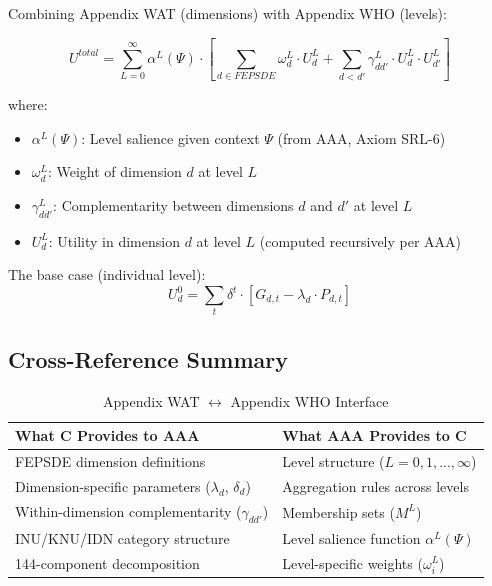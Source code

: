 \begin{tcolorbox}[colback=blue!5!white, colframe=blue!75!black, 
    title=The Complete EBF Utility Structure]

Combining Appendix WAT (dimensions) with Appendix WHO (levels):

\begin{equation}
\boxed{
U^{total} = \sum_{L=0}^{\infty} \alpha^L(\Psi) \cdot \left[ \sum_{d \in FEPSDE} \omega^L_d \cdot U^L_d + \sum_{d < d'} \gamma^L_{dd'} \cdot U^L_d \cdot U^L_{d'} \right]
}
\end{equation}

where:
\begin{itemize}[nosep]
\item $\alpha^L(\Psi)$: Level salience given context $\Psi$ (from AAA, Axiom SRL-6)
\item $\omega^L_d$: Weight of dimension $d$ at level $L$
\item $\gamma^L_{dd'}$: Complementarity between dimensions $d$ and $d'$ at level $L$
\item $U^L_d$: Utility in dimension $d$ at level $L$ (computed recursively per AAA)
\end{itemize}

The base case (individual level):
\begin{equation}
U^0_d = \sum_t \delta^t \cdot [G_{d,t} - \lambda_d \cdot P_{d,t}]
\end{equation}
\end{tcolorbox}

\subsection{Cross-Reference Summary}

\begin{table}[htbp]
\centering
\caption{Appendix WAT $\leftrightarrow$ Appendix WHO Interface}
\label{tab:app-c-aaa-interface}
\renewcommand{\arraystretch}{1.3}
\begin{tabular}{@{}p{6cm}p{6cm}@{}}
\toprule
\textbf{What C Provides to AAA} & \textbf{What AAA Provides to C} \\
\midrule
FEPSDE dimension definitions & Level structure ($L = 0, 1, ..., \infty$) \\
Dimension-specific parameters ($\lambda_d$, $\delta_d$) & Aggregation rules across levels \\
Within-dimension complementarity ($\gamma_{dd'}$) & Membership sets ($M^L$) \\
INU/KNU/IDN category structure & Level salience function $\alpha^L(\Psi)$ \\
144-component decomposition & Level-specific weights ($\omega^L_i$) \\
\bottomrule
\end{tabular}
\end{table}

